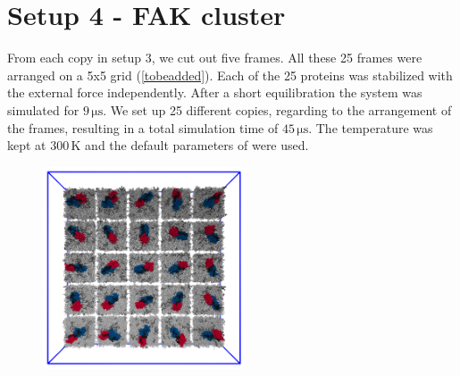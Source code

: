 \section{Setup 4 - FAK cluster}
From each copy in setup 3, we cut out five frames. All these 25 frames were arranged on a {5x5} grid (\autoref{tobeadded}). Each of the 25 proteins was stabilized with the external force independently. After a short equilibration the system was simulated for $9\,\si{\micro\second}$. We set up 25 different copies, regarding to the arrangement of the frames, resulting in a total simulation time of $45\,\si{\micro\second}$. The temperature was kept at $300\,\si{\kelvin}$ and the default parameters of \martini{} were used.
%
%
%
\begin{figure}[h]
	\centering
	\includegraphics[height=6cm]{figures/setup/setup_cluster}
	\label{setup:setup4_pic}
\end{figure}
%
%
%